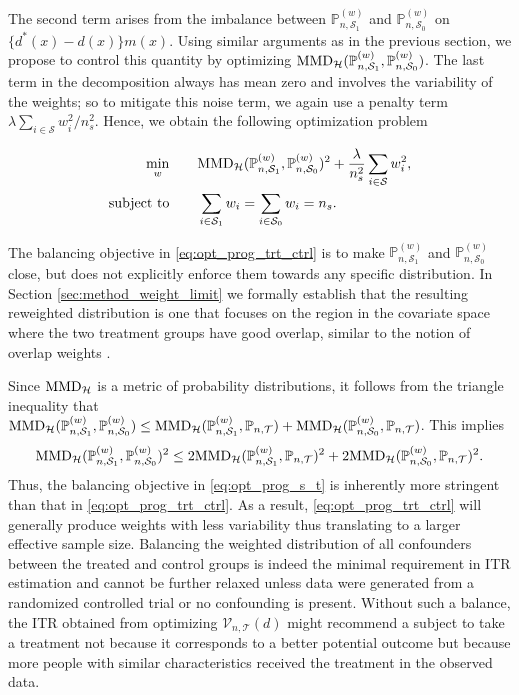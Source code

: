 \documentclass[12pt]{article}
\newcommand{\prob}{\mathbb{P}}
\begin{document}
The second term arises from the imbalance between $\prob_{n,\mathcal{S}_1}^{(w)}$ and $\prob_{n,\mathcal{S}_0}^{(w)}$ on $\{d^*(x) - d(x)\} m(x)$. Using similar arguments as in the previous section, we propose to control this quantity by optimizing $\textnormal{MMD}_\mathcal{H}(\prob_{n,\mathcal{S}_1}^{(w)}, \prob_{n,\mathcal{S}_0}^{(w)})$. The last term in the decomposition always has mean zero and involves the variability of the weights; so to mitigate this noise term, we again use a penalty term $ \lambda \sum_{i \in \mathcal{S}} w_i^2/ n_s^2$. Hence, we obtain the following optimization problem

\begin{equation}
    \label{eq:opt_prog_trt_ctrl}
    \begin{aligned}
    \min_w &\qquad
    \textnormal{MMD}_\mathcal{H}(\prob_{n,\mathcal{S}_1}^{(w)}, \prob_{n,\mathcal{S}_0}^{(w)})^2 + 
    \frac{\lambda}{n_s^2} \sum_{i \in \mathcal{S}} w_i^2,
    \\
    \textnormal{subject to}&\qquad
    \sum_{i \in \mathcal{S}_1} w_i = \sum_{i \in \mathcal{S}_0} w_i = n_s
    .\end{aligned}
\end{equation}

The balancing objective in \eqref{eq:opt_prog_trt_ctrl} is to make $\prob_{n,\mathcal{S}_1}^{(w)}$ and $\prob_{n,\mathcal{S}_0}^{(w)}$ close, but does not explicitly enforce them towards any specific distribution. In Section \ref{sec:method_weight_limit} we formally establish that the resulting reweighted distribution is one that focuses on the region in the covariate space where the two treatment groups have good overlap, similar to the notion of overlap weights \citep{li2018balancing}.

Since $\textnormal{MMD}_\mathcal{H}$ is a metric of probability distributions, it follows from the triangle inequality that $\textnormal{MMD}_\mathcal{H}(\prob_{n,\mathcal{S}_1}^{(w)}, \prob_{n,\mathcal{S}_0}^{(w)}) \le \textnormal{MMD}_\mathcal{H}(\prob_{n,\mathcal{S}_1}^{(w)}, \prob_{n,\mathcal{T}}) + \textnormal{MMD}_\mathcal{H}(\prob_{n,\mathcal{S}_0}^{(w)}, \prob_{n,\mathcal{T}})$. This implies $$\textnormal{MMD}_\mathcal{H}(\prob_{n,\mathcal{S}_1}^{(w)}, \prob_{n,\mathcal{S}_0}^{(w)})^2 \le 2\textnormal{MMD}_\mathcal{H}(\prob_{n,\mathcal{S}_1}^{(w)}, \prob_{n,\mathcal{T}})^2 + 2\textnormal{MMD}_\mathcal{H}(\prob_{n,\mathcal{S}_0}^{(w)}, \prob_{n,\mathcal{T}})^2.$$ Thus, the balancing objective in \eqref{eq:opt_prog_s_t} is inherently more stringent than that in \eqref{eq:opt_prog_trt_ctrl}. As a result, \eqref{eq:opt_prog_trt_ctrl} will generally produce weights with less variability thus translating to a larger effective sample size. Balancing the weighted distribution of all confounders between the treated and control groups is indeed the minimal requirement in ITR estimation and cannot be further relaxed unless data were generated from a randomized controlled trial or no confounding is present. Without such a balance, the ITR obtained from optimizing $\mathcal{V}_{n,\mathcal{T}}(d)$ might recommend a subject to take a treatment not because it corresponds to a better potential outcome but because more people with similar characteristics received the treatment in the observed data.
\end{document}

